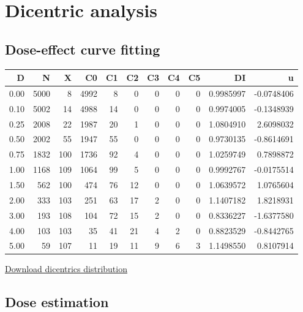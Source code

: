\documentclass[]{scrartcl}
\begin{document}
\hypertarget{stats-dicent}{%
\section{Dicentric analysis}\label{stats-dicent}}

\hypertarget{dose-effect-curve-fitting}{%
\subsection{Dose-effect curve fitting}\label{dose-effect-curve-fitting}}

\begin{tabular}{r|r|r|r|r|r|r|r|r|r|r}
\hline
D & N & X & C0 & C1 & C2 & C3 & C4 & C5 & DI & u\\
\hline
0.00 & 5000 & 8 & 4992 & 8 & 0 & 0 & 0 & 0 & 0.9985997 & -0.0748406\\
\hline
0.10 & 5002 & 14 & 4988 & 14 & 0 & 0 & 0 & 0 & 0.9974005 & -0.1348939\\
\hline
0.25 & 2008 & 22 & 1987 & 20 & 1 & 0 & 0 & 0 & 1.0804910 & 2.6098032\\
\hline
0.50 & 2002 & 55 & 1947 & 55 & 0 & 0 & 0 & 0 & 0.9730135 & -0.8614691\\
\hline
0.75 & 1832 & 100 & 1736 & 92 & 4 & 0 & 0 & 0 & 1.0259749 & 0.7898872\\
\hline
1.00 & 1168 & 109 & 1064 & 99 & 5 & 0 & 0 & 0 & 0.9992767 & -0.0175514\\
\hline
1.50 & 562 & 100 & 474 & 76 & 12 & 0 & 0 & 0 & 1.0639572 & 1.0765604\\
\hline
2.00 & 333 & 103 & 251 & 63 & 17 & 2 & 0 & 0 & 1.1407182 & 1.8218931\\
\hline
3.00 & 193 & 108 & 104 & 72 & 15 & 2 & 0 & 0 & 0.8336227 & -1.6377580\\
\hline
4.00 & 103 & 103 & 35 & 41 & 21 & 4 & 2 & 0 & 0.8823529 & -0.8442765\\
\hline
5.00 & 59 & 107 & 11 & 19 & 11 & 9 & 6 & 3 & 1.1498550 & 0.8107914\\
\hline
\end{tabular}

\href{https://biodosimetry-uab.github.io/documentation/data/count-data-IAEA.csv}{Download dicentrics distribution}

\hypertarget{dose-estimation}{%
\subsection{Dose estimation}\label{dose-estimation}}
\end{document}
